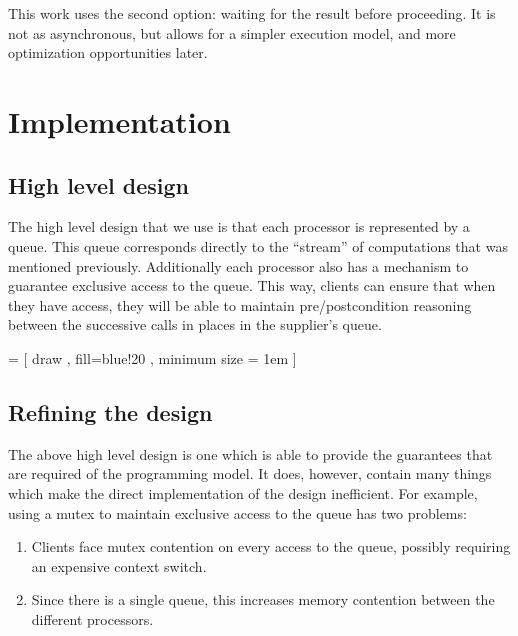 \documentclass[a4]{article}
\begin{document}
This work uses the second option:
waiting for the result before proceeding.
It is not as asynchronous, but allows for a simpler execution model,
and more optimization opportunities later.


\section{Implementation}
\subsection{High level design}
The high level design that we use is that each processor is
represented by a queue.
This queue corresponds directly to the ``stream'' of computations
that was mentioned previously.
Additionally each processor also has a mechanism to
guarantee exclusive access to the queue.
This way,
clients can ensure that when they have access,
they will be able to maintain pre/postcondition reasoning
between the successive calls in places in the supplier's queue.

 =
  [ draw
  , fill=blue!20
  , minimum size = 1em
  ]

\def\queueAt#1#2#3{
  \foreach \x in {0, 1,...,4} {
    \node[queue_block] at (#1 em + \x em, #2 em) (queue_block_\x_#3) {};
  }
}
\begin{center}
\end{center}
\subsection{Refining the design}
The above high level design is one which is able to provide
the guarantees that are required of the programming model.
It does, however, contain many things which make the
direct implementation of the design inefficient.
For example,
using a mutex to maintain exclusive access to the queue
has two problems:

\begin{enumerate}
\item Clients face mutex contention on every access to the queue,
  possibly requiring an expensive context switch.
\item Since there is a single queue, this increases memory contention between
  the different processors.
\end{enumerate}
\end{document}
